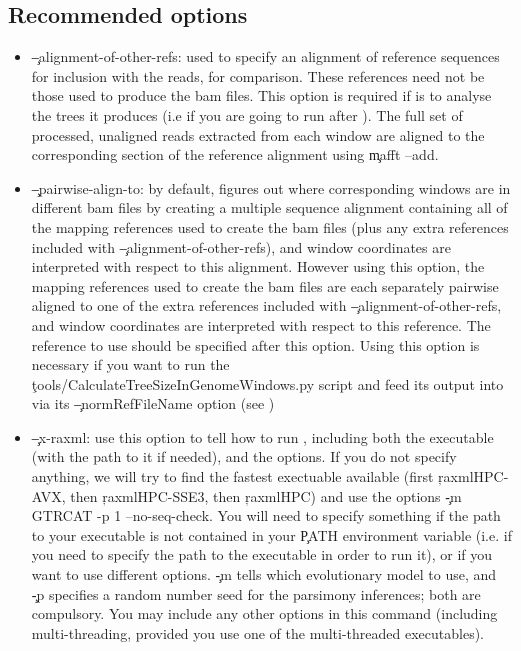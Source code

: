 \subsection{Recommended options} \label{sec:RecArgs}
\begin{itemize}
\item \c{--alignment-of-other-refs}: used to specify an alignment of reference sequences for inclusion with the reads, for comparison.
These references need not be those used to produce the bam files.
This option is required if \p is to analyse the trees it produces (i.e if you are going to run \pat after \pmt).
The full set of processed, unaligned reads extracted from each window are aligned to the corresponding section of the reference alignment using \c{mafft --add}.
\item \c{--pairwise-align-to}: by default, \pmt figures out where corresponding windows are in different bam files by creating a multiple sequence alignment containing all of the mapping references used to create the bam files (plus any extra references included with \c{--alignment-of-other-refs}), and window coordinates are interpreted with respect to this alignment.
However using this option, the mapping references used to create the bam files are each separately pairwise aligned to one of the extra references included with \c{--alignment-of-other-refs}, and window coordinates are interpreted with respect to this reference.
The reference to use should be specified after this option.
Using this option is necessary if you want to run the \c{tools/CalculateTreeSizeInGenomeWindows.py} script and feed its output into \pat via its \c{--normRefFileName} option (see )
\item \c{--x-raxml}: use this option to tell \pmt how to run \R, including both the executable (with the path to it if needed), and the options.
If you do not specify anything, we will try to find the fastest \R exectuable available (first \c{raxmlHPC-AVX}, then \c{raxmlHPC-SSE3}, then \c{raxmlHPC}) and use the options \c{-m GTRCAT -p 1 --no-seq-check}.
You will need to specify something if the path to your \R executable is not contained in your \c{PATH} environment variable (i.e. if you need to specify the path to the executable in order to run it), or if you want to use different \R options.
\c{-m} tells \R which evolutionary model to use, and \c{-p} specifies a random number seed for the parsimony inferences; both are compulsory.
You may include any other \R options in this command (including multi-threading, provided you use one of the multi-threaded executables).

\end{itemize}
